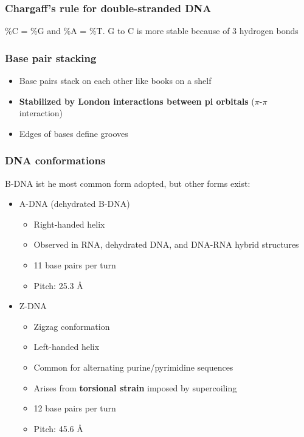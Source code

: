 \documentclass[letterpaper, 12pt]{article}
\begin{document}
\subsubsection*{Chargaff's rule for double-stranded DNA}
\%C = \%G and \%A = \%T. G to C is more stable because of 3 hydrogen bonds

\subsubsection*{Base pair stacking}
\begin{itemize}
\item Base pairs stack on each other like books on a shelf
\item \textbf{Stabilized by London interactions between pi orbitals} ($\pi$-$\pi$ interaction)
\item Edges of bases define grooves
\end{itemize}

\subsubsection*{DNA conformations}
B-DNA ist he most common form adopted, but other forms exist:
\begin{itemize}
\item A-DNA (dehydrated B-DNA)
\begin{itemize}
\item Right-handed helix
\item Observed in RNA, dehydrated DNA, and DNA-RNA hybrid structures
\item 11 base pairs per turn
\item Pitch: 25.3 Å
\end{itemize}
\item Z-DNA
\begin{itemize}
\item Zigzag conformation
\item Left-handed helix
\item Common for alternating purine/pyrimidine sequences
\item Arises from \textbf{torsional strain} imposed by supercoiling
\item 12 base pairs per turn
\item Pitch: 45.6 Å
\end{itemize}
\end{itemize}
\end{document}
